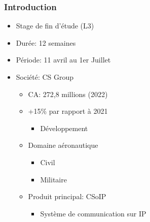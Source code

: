 \begin{frame}
    \frametitle{Introduction}
    \begin{itemize}
        \item Stage de fin d'étude (L3)
        \item Durée: 12 semaines
        \item Période: 11 avril au 1er Juillet
        \item Société: CS Group
            \begin{itemize}
                \item CA: 272,8 millions (2022)
                \item +15\% par rapport à 2021
                    \begin{itemize}
                        \item Développement
                    \end{itemize}
                \item Domaine aéronautique
                    \begin{itemize}
                        \item Civil
                        \item Militaire
                    \end{itemize}
                \item Produit principal: CSoIP
                    \begin{itemize}
                        \item Système de communication sur IP
                    \end{itemize}
            \end{itemize}
    \end{itemize}
\end{frame}